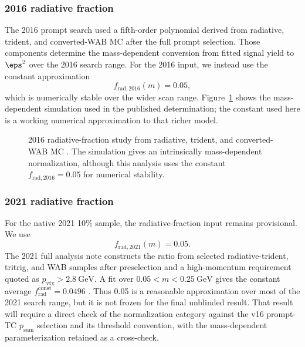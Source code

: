 \subsubsection{2016 radiative fraction}

The 2016 prompt search used a fifth-order polynomial derived from radiative, trident,
and converted-WAB MC after the full prompt selection. Those components determine the
mass-dependent conversion from fitted signal yield to $\eps^2$ over the 2016 search
range. For the 2016 input, we instead use the constant approximation
\begin{equation}
f_{\mathrm{rad},2016}(m) = 0.05,
\end{equation}
which is numerically stable over the wider scan range. Figure~\ref{fig:2016-radfrac}
shows the mass-dependent simulation used in the published determination; the constant
used here is a working numerical approximation to that richer model.

\begin{figure}[H]
\centering
{}
\caption{2016 radiative-fraction study from radiative, trident, and converted-WAB MC
\cite{HPS2016BumpInternal}. The simulation gives an intrinsically mass-dependent
normalization, although this analysis uses the constant
$f_{\mathrm{rad},2016}=0.05$ for numerical stability.}
\label{fig:2016-radfrac}
\end{figure}

\subsubsection{2021 radiative fraction}

For the native 2021 10\% sample, the radiative-fraction input remains provisional. We
use
\begin{equation}
f_{\mathrm{rad},2021}(m) = 0.05.
\end{equation}
The 2021 full analysis note constructs the ratio from selected radiative-trident,
tritrig, and WAB samples after preselection and a high-momentum requirement quoted as
$p_{\mathrm{vtx}}>2.8~\mathrm{GeV}$. A fit over
$0.05<m<0.25~\mathrm{GeV}$ gives the constant average
$f_{\mathrm{rad}}^{\mathrm{const}}=0.0496$ \cite[Sec.~6.1, Figs.~92--93,
Eqs.~25--26]{HPS2021FullAnalysisNote}. Thus 0.05 is a reasonable approximation over
most of the 2021 search range, but it is not frozen for the final unblinded result.
That result will require a direct check of the normalization category against the v16
prompt-TC $p_{\mathrm{sum}}$ selection and its threshold convention, with the
mass-dependent parameterization retained as a cross-check.

